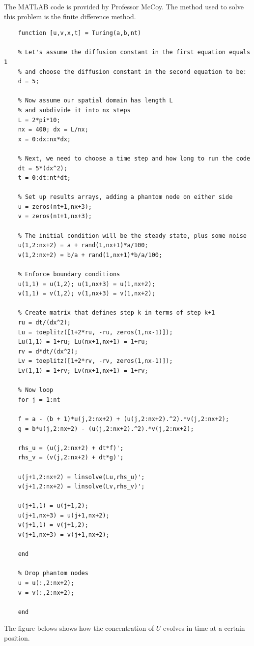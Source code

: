 \documentclass{book}
\theoremstyle{definition}
\begin{document}
The MATLAB code is provided by Professor McCoy. The method used to solve this problem is the finite difference method. 


\begin{framed}
	\begin{verbatim}
	function [u,v,x,t] = Turing(a,b,nt)
	
	% Let's assume the diffusion constant in the first equation equals 1
	% and choose the diffusion constant in the second equation to be:
	d = 5;
	
	% Now assume our spatial domain has length L
	% and subdivide it into nx steps
	L = 2*pi*10;
	nx = 400; dx = L/nx;
	x = 0:dx:nx*dx;
	
	% Next, we need to choose a time step and how long to run the code
	dt = 5*(dx^2);
	t = 0:dt:nt*dt;
	
	% Set up results arrays, adding a phantom node on either side
	u = zeros(nt+1,nx+3);
	v = zeros(nt+1,nx+3);
	
	% The initial condition will be the steady state, plus some noise
	u(1,2:nx+2) = a + rand(1,nx+1)*a/100;
	v(1,2:nx+2) = b/a + rand(1,nx+1)*b/a/100;
	
	% Enforce boundary conditions
	u(1,1) = u(1,2); u(1,nx+3) = u(1,nx+2);
	v(1,1) = v(1,2); v(1,nx+3) = v(1,nx+2);
	
	% Create matrix that defines step k in terms of step k+1
	ru = dt/(dx^2);
	Lu = toeplitz([1+2*ru, -ru, zeros(1,nx-1)]);
	Lu(1,1) = 1+ru; Lu(nx+1,nx+1) = 1+ru;
	rv = d*dt/(dx^2);
	Lv = toeplitz([1+2*rv, -rv, zeros(1,nx-1)]);
	Lv(1,1) = 1+rv; Lv(nx+1,nx+1) = 1+rv;
	
	% Now loop
	for j = 1:nt
	
	f = a - (b + 1)*u(j,2:nx+2) + (u(j,2:nx+2).^2).*v(j,2:nx+2);
	g = b*u(j,2:nx+2) - (u(j,2:nx+2).^2).*v(j,2:nx+2);
	
	rhs_u = (u(j,2:nx+2) + dt*f)';
	rhs_v = (v(j,2:nx+2) + dt*g)';
	
	u(j+1,2:nx+2) = linsolve(Lu,rhs_u)';
	v(j+1,2:nx+2) = linsolve(Lv,rhs_v)';
	
	u(j+1,1) = u(j+1,2);
	u(j+1,nx+3) = u(j+1,nx+2);
	v(j+1,1) = v(j+1,2);
	v(j+1,nx+3) = v(j+1,nx+2);
	
	end
	
	% Drop phantom nodes
	u = u(:,2:nx+2);
	v = v(:,2:nx+2);
	
	end
	\end{verbatim}
\end{framed}

The figure belows shows how the concentration of $U$ evolves in time at a certain position. 
\end{document}
